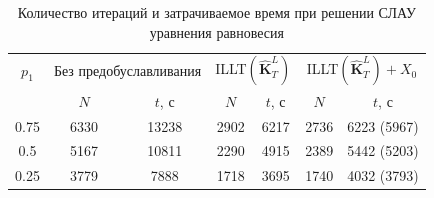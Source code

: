 \begin{table}[htbp]
    \centering
    \begin{threeparttable}%
        \caption{Количество итераций и затрачиваемое время при решении СЛАУ уравнения равновесия}\label{tab:StressPrecond}
        \begin{tabular}{|c|c|c|c|c|c|c|}
		\hline
		$p_1$ & \multicolumn{2}{c|}{Без предобуславливания} & \multicolumn{2}{c|}{ILLT$\left( \widehat{\textbf{K}}^L_T \right)$} & \multicolumn{2}{c|}{ILLT$\left( \widehat{\textbf{K}}^L_T \right) + X_0$}\\
		\cline{2-7}
		     & $N$ & $t$, с & $N$ & $t$, с & $N$ & $t$, с \\
		\hline
		0.75 & 6330 & 13238 & 2902 & 6217 & 2736 & 6223 (5967) \\
		\hline
		0.5  & 5167 & 10811 & 2290 & 4915 & 2389 & 5442 (5203) \\
		\hline
		0.25 & 3779 & 7888 & 1718 & 3695 & 1740 & 4032 (3793) \\
		\hline
        \end{tabular}
    \end{threeparttable}
\end{table}